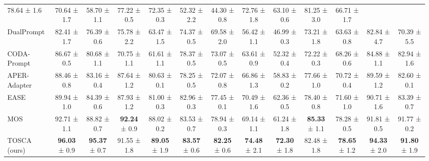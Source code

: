 \begin{table}[h]
{\begin{tabular}{lcccccccccccc}
  78.64 \footnotesize{± 1.6} &
  70.64 \footnotesize{± 1.7} &
  58.70 \footnotesize{± 1.1} &
  77.22 \footnotesize{± 0.5} &
  72.35 \footnotesize{± 0.3} &
  52.32 \footnotesize{± 2.2} &
  44.30 \footnotesize{± 0.8} &
  72.76 \footnotesize{± 1.8} &
  63.10 \footnotesize{± 0.6} &
  81.25 \footnotesize{± 3.0} &
  66.71 \footnotesize{± 1.7} \\
DualPrompt &
  82.41 \footnotesize{± 1.7} &
  76.39 \footnotesize{± 0.6} &
  75.78 \footnotesize{± 2.2} &
  63.47 \footnotesize{± 1.5} &
  74.37 \footnotesize{± 0.5} &
  69.58 \footnotesize{± 2.0} &
  56.42 \footnotesize{± 1.1} &
  46.99 \footnotesize{± 0.3} &
  73.21 \footnotesize{± 1.8} &
  63.63 \footnotesize{± 0.8} &
  82.84 \footnotesize{± 4.7} &
  70.39 \footnotesize{± 5.5} \\
CODA-Prompt &
  86.67 \footnotesize{± 0.5} &
  80.68 \footnotesize{± 1.1} &
  70.75 \footnotesize{± 1.1} &
  61.61 \footnotesize{± 1.1} &
  78.37 \footnotesize{± 0.5} &
  73.07 \footnotesize{± 0.5} &
  63.61 \footnotesize{± 0.9} &
  52.32 \footnotesize{± 0.4} &
  72.22 \footnotesize{± 0.3} &
  68.26 \footnotesize{± 0.6} &
  84.88 \footnotesize{± 1.1} &
  82.94 \footnotesize{± 1.6} \\
APER-Adapter &
  88.46 \footnotesize{± 0.8} &
  83.16 \footnotesize{± 0.4} &
  87.64 \footnotesize{± 1.2} &
  80.63 \footnotesize{± 0.1} &
  78.25 \footnotesize{± 0.5} &
  72.07 \footnotesize{± 0.8} &
  66.86 \footnotesize{± 1.3} &
  58.83 \footnotesize{± 0.2} &
  77.66 \footnotesize{± 1.0} &
  70.72 \footnotesize{± 0.4} &
  89.59 \footnotesize{± 1.2} &
  82.60 \footnotesize{± 0.1} \\
EASE &
  89.94 \footnotesize{± 1.0} &
  84.39 \footnotesize{± 0.6} &
  87.93 \footnotesize{± 1.2} &
  81.00 \footnotesize{± 0.3} &
  82.96 \footnotesize{± 0.3}&
  77.45 \footnotesize{± 0.1}&
  70.49 \footnotesize{± 1.6}&
  62.36 \footnotesize{± 0.5} &
  78.40 \footnotesize{± 0.8} &
  71.60 \footnotesize{± 1.0} &
  90.71 \footnotesize{± 1.6} &
  83.39 \footnotesize{± 0.7} \\
MOS &
  92.71 \footnotesize{± 1.1} &
  88.82 \footnotesize{± 0.7} &
  \textbf{92.24} \footnotesize{± 0.9} &
  88.02 \footnotesize{± 0.2} &
  83.53 \footnotesize{± 0.7} &
  78.94 \footnotesize{± 0.3} &
  69.14 \footnotesize{± 1.1} &
  61.24 \footnotesize{± 1.8} &
  \textbf{85.33} \footnotesize{± 1.1} &
  78.28 \footnotesize{± 0.5} &
  91.81 \footnotesize{± 0.5} &
  91.77 \footnotesize{± 0.2} \\ \hline
\rowcolor{pink!20}
TOSCA (ours) &
  \textbf{96.03} \footnotesize{± 0.9} &
  \textbf{95.37} \footnotesize{± 0.7} &
  91.55 \footnotesize{± 1.8} &
  \textbf{89.05} \footnotesize{± 1.9} &
  \textbf{83.57} \footnotesize{± 0.6} &
  \textbf{82.25} \footnotesize{± 0.6} &
  \textbf{74.48} \footnotesize{± 2.1} &
  \textbf{72.30} \footnotesize{± 1.8} &
  82.48 \footnotesize{± 1.8} &
  \textbf{78.65} \footnotesize{± 1.2} &
  \textbf{94.33} \footnotesize{± 2.0} &
  \textbf{91.80} \footnotesize{± 1.9} \\ \hline
\end{tabular}%
}
\end{table}

